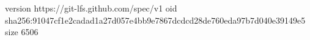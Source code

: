 version https://git-lfs.github.com/spec/v1
oid sha256:91047cf1e2cadad1a27d057e4bb9e7867dcdcd28de760eda97b7d040e39149e5
size 6506
